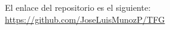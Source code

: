 El enlace del repositorio es el siguiente:
\\

\url{https://github.com/JoseLuisMunozP/TFG}

	
	
	
	
	
	
	
\begin{comment}


\begin{description}
\item[Índice de contenidos:] (obligatorio siempre) se incluirá un índice de las secciones de las que se componga el documento, la numeración de las 
divisiones y subdivisiones utilizarán cifras arábigas (según UNE 50132:1994) y harán mención a la página del documento donde se ubiquen.
\item[Índice de figuras:] si el documento incluye figuras se podrá incluir también un índice con su relación, indicando la página donde se ubiquen.
\item[Índice de tablas:] en caso de existir en el texto, ídem que el anterior.
\item[Índice de abreviaturas, siglas, símbolos, etc.:] en caso de ser necesarios se podrá incluir cada uno de ellos.
\end{description}
\item[Cuerpo del documento:] en el contenido del documento se da flexibilidad para su organización y se puede estructurar en las secciones que se considere. En todo caso obligatoriamente se deberá, al menos, incluir los siguientes contenidos:
\begin{description}
\item[Introducción:] donde se hará énfasis a la importancia de la temática, su vigencia y actualidad; se planteará el problema a investigar, así como el propósito o finalidad de la investigación.
\item[Marco teórico o Estado del arte:] se hará mención a los elementos conceptuales que sirven de base para la investigación, estudios previos relacionados con el problema planteado, etc.
\item[Objetivos:] se establecerá el objetivo general y los específicos.
\item[Metodología:] se indicará el tipo o tipos de investigación, las técnicas y los procedimientos que serán utilizados para llevarla a cabo; se identificará la población y el tamaño de la muestra así como las técnicas e instrumentos de recolección de datos.
\item[Resultados:] incluirá los resultados de la investigación o trabajo, así como el análisis y la discusión de los mismos.

\end{comment}
